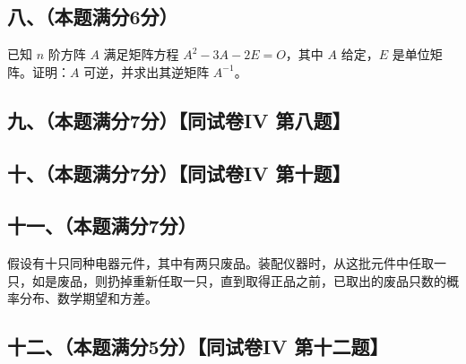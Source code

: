 \documentclass[UTF8,12pt]{ctexart}
\begin{document}
\subsection*{八、（本题满分6分）}

已知 \(\displaystyle n\) 阶方阵 \(\displaystyle A\) 满足矩阵方程 \(\displaystyle A^2-3A-2E=O\)，其中 \(\displaystyle A\) 给定，\(\displaystyle E\) 是单位矩阵。证明：\(\displaystyle A\) 可逆，并求出其逆矩阵 \(\displaystyle A^{-1}\)。


\subsection*{九、（本题满分7分）【同试卷IV 第八题】}

\subsection*{十、（本题满分7分）【同试卷IV 第十题】}

\subsection*{十一、（本题满分7分）}

假设有十只同种电器元件，其中有两只废品。装配仪器时，从这批元件中任取一只，如是废品，则扔掉重新任取一只，直到取得正品之前，已取出的废品只数的概率分布、数学期望和方差。


\subsection*{十二、（本题满分5分）【同试卷IV 第十二题】}
\end{document}
